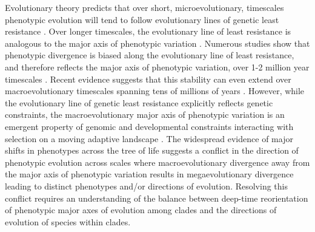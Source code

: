 \documentclass[12pt,letterpaper]{article}
\begin{document}
Evolutionary theory predicts that over short, microevolutionary, timescales phenotypic evolution will tend to follow evolutionary lines of genetic least resistance \cite{schluter1996adaptive}.
Over longer timescales, the evolutionary line of least resistance is analogous to the major axis of phenotypic variation \cite{marroig2005size,renaud2006conserved,fasanelli2022allometry}.
Numerous studies show that phenotypic divergence is biased along the evolutionary line of least resistance, and therefore reflects the major axis of phenotypic variation, over 1-2 million year timescales \cite{marroig2005size, mcglothlin2018adaptive, tsuboi2018}.
Recent evidence suggests that this stability can even extend over macroevolutionary timescales spanning tens of millions of years \cite{mcglothlin2018adaptive}.
However, while the evolutionary line of genetic least resistance explicitly reflects genetic constraints, the macroevolutionary major axis of phenotypic variation is an emergent property of genomic and developmental constraints interacting with selection on a moving adaptive landscape \cite{jones2004evolution,BurinWhales}.
The widespread evidence of major shifts in phenotypes across the tree of life \cite{venditti2011multiple,pagel2022general,khabbazian2016fast,cooney2017mega,smaers2021evolution,goswami2022} suggests a conflict in the direction of phenotypic evolution across scales where macroevolutionary divergence away from the major axis of phenotypic variation results in megaevolutionary divergence leading to distinct phenotypes and/or directions of evolution.
Resolving this conflict requires an understanding of the balance between deep-time reorientation of phenotypic major axes of evolution among clades and the directions of evolution of species within clades.
\end{document}
